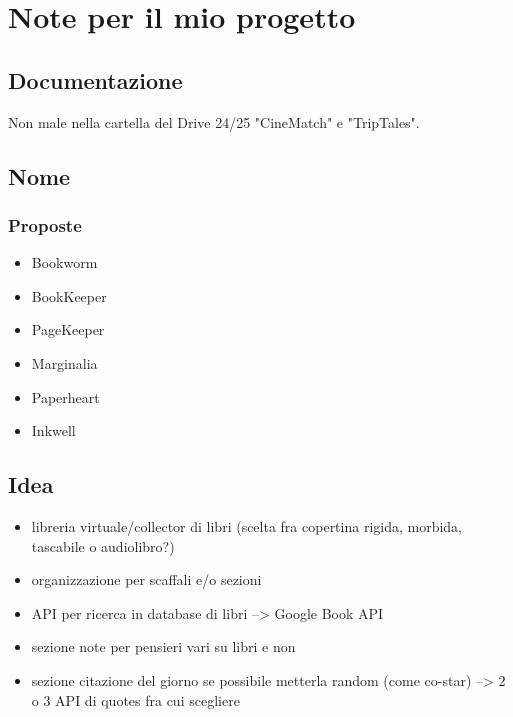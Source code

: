 
\chapter{Note per il mio progetto}
\section{Documentazione}
\par Non male nella cartella del Drive 24/25 "CineMatch" e "TripTales".

\section{Nome}
\subsection{Proposte}
\begin{itemize}
    \item Bookworm
    \item BookKeeper
    \item PageKeeper
    \item Marginalia
    \item Paperheart
    \item Inkwell
\end{itemize}

\section{Idea}
\begin{itemize}
    \item libreria virtuale/collector di libri (scelta fra copertina rigida, morbida, tascabile o audiolibro?)
    \item organizzazione per scaffali e/o sezioni
    \item API per ricerca in database di libri --> Google Book API
    \item sezione note per pensieri vari su libri e non
    \item sezione citazione del giorno se possibile metterla random (come co-star) --> 2 o 3 API di quotes fra cui scegliere
\end{itemize}